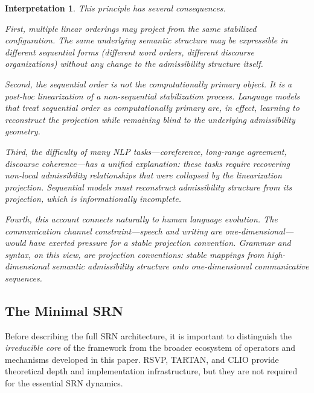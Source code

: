 \documentclass[11pt, a4paper]{article}
\theoremstyle{srn}
\theoremstyle{srnremark}
\newtheorem{interpretation}{Interpretation}[section]
\begin{document}
\begin{interpretation}
This principle has several consequences.

First, \emph{multiple linear orderings may project from the same
stabilized configuration}.
The same underlying semantic structure may be expressible in different
sequential forms (different word orders, different discourse
organizations) without any change to the admissibility structure
itself.

Second, \emph{the sequential order is not the computationally primary
object}.
It is a post-hoc linearization of a non-sequential stabilization
process.
Language models that treat sequential order as computationally primary
are, in effect, learning to reconstruct the projection while remaining
blind to the underlying admissibility geometry.

Third, \emph{the difficulty of many NLP tasks---coreference,
long-range agreement, discourse coherence---has a unified explanation}:
these tasks require recovering non-local admissibility relationships
that were collapsed by the linearization projection.
Sequential models must reconstruct admissibility structure from its
projection, which is informationally incomplete.

Fourth, this account connects naturally to human language evolution.
The communication channel constraint---speech and writing are
one-dimensional---would have exerted pressure for a stable projection
convention.
Grammar and syntax, on this view, are \emph{projection conventions}:
stable mappings from high-dimensional semantic admissibility structure
onto one-dimensional communicative sequences.
\end{interpretation}


\subsection{The Minimal SRN}
\label{subsec:minimal}

Before describing the full SRN architecture, it is important to
distinguish the \emph{irreducible core} of the framework from the
broader ecosystem of operators and mechanisms developed in this paper.
RSVP, TARTAN, and CLIO provide theoretical depth and implementation
infrastructure, but they are not required for the essential SRN
dynamics.
\end{document}
